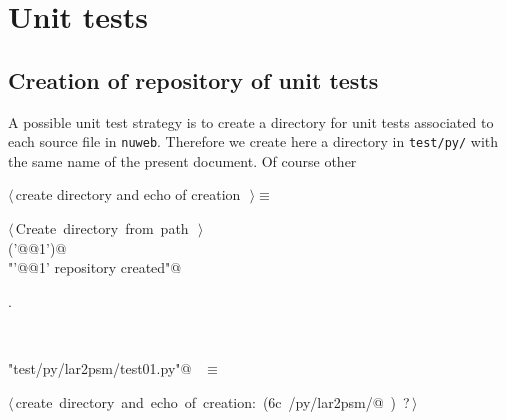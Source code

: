\documentclass[11pt,oneside]{article}	%
\begin{document}
\section{Unit tests}

\subsection{Creation of repository of unit tests}

A possible unit test strategy is to create a directory for unit tests associated to each source file in \texttt{nuweb}. Therefore we create here a directory in \texttt{test/py/} with the same name of the present document. Of course other 

\begin{flushleft} \small
\begin{minipage}{\linewidth} \label{scrap17}
$\langle\,$create directory and echo of creation\nobreak\ {\footnotesize {}}$\,\rangle\equiv$
\vspace{-1ex}
\begin{list}{}{} \item
\mbox{}\verb@@\hbox{$\langle\,$Create directory from path\nobreak\ {\footnotesize {}}$\,\rangle$}\verb@@\\
\mbox{}\verb@createDir('@@1\verb@')@\\
\mbox{}\verb@print "'@@1\verb@' repository created"@\\
\mbox{}\verb@@{\NWsep}
\end{list}
\vspace{-1ex}
\footnotesize\addtolength{\baselineskip}{-1ex}
\begin{list}{}{\setlength{\itemsep}{-\parsep}\setlength{\itemindent}{-\leftmargin}}
\item {\NWtxtMacroNoRef}.
\end{list}
\end{minipage}\\[4ex]
\end{flushleft}

\begin{flushleft} \small
\begin{minipage}{\linewidth} \label{scrap18}
\verb@"test/py/lar2psm/test01.py"@\nobreak\ {\footnotesize {} }$\equiv$
\vspace{-1ex}
\begin{list}{}{} \item
\mbox{}\verb@@\hbox{$\langle\,$create directory and echo of creation:\nobreak\ ({\footnotesize 6c\label{scrap19}
 }\mbox{}\verb@test/py/lar2psm/@ ) {\footnotesize ?}$\,\rangle$}\verb@@\\
\mbox{}\verb@@{\NWsep}
\end{list}
\vspace{-2ex}
\end{minipage}\\[4ex]
\end{flushleft}
\end{document}
